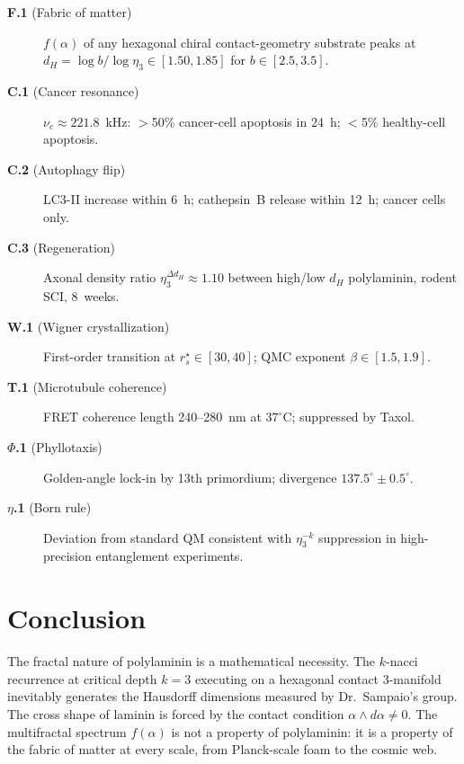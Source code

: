 \documentclass[12pt,a4paper]{article}
\newcommand{\etatrib}{\eta_3}
\newcommand{\falph}{f(\alpha)}
\newcommand{\kn}{$k$-nacci}
\begin{document}
\begin{description}
\item[\textbf{F.1} (Fabric of matter)]
  $\falph$ of any hexagonal chiral contact-geometry substrate peaks at
  $d_H=\log b/\log\etatrib\in[1.50,1.85]$ for $b\in[2.5,3.5]$.

\item[\textbf{C.1} (Cancer resonance)]
  $\nu_c\approx 221.8$~kHz: $>$50\% cancer-cell apoptosis in 24~h;
  $<$5\% healthy-cell apoptosis.

\item[\textbf{C.2} (Autophagy flip)]
  LC3-II increase within 6~h; cathepsin~B release within 12~h;
  cancer cells only.

\item[\textbf{C.3} (Regeneration)]
  Axonal density ratio $\etatrib^{\Delta d_H}\approx 1.10$
  between high/low $d_H$ polylaminin, rodent SCI, 8~weeks.

\item[\textbf{W.1} (Wigner crystallization)]
  First-order transition at $r_s^\star\in[30,40]$;
  QMC exponent $\beta\in[1.5,1.9]$.

\item[\textbf{T.1} (Microtubule coherence)]
  FRET coherence length 240--280~nm at $37^\circ$C;
  suppressed by Taxol.

\item[\textbf{$\Phi$.1} (Phyllotaxis)]
  Golden-angle lock-in by 13th primordium;
  divergence $137.5^\circ\pm 0.5^\circ$.

\item[\textbf{$\eta$.1} (Born rule)]
  Deviation from standard QM consistent with $\etatrib^{-k}$
  suppression in high-precision entanglement experiments.
\end{description}


\section{Conclusion}
\label{sec:conclusion}

The fractal nature of polylaminin is a mathematical necessity. The \kn{}
recurrence at critical depth $k=3$ executing on a hexagonal contact
3-manifold inevitably generates the Hausdorff dimensions measured by
Dr.\ Sampaio's group. The cross shape of laminin is forced by the contact
condition $\alpha\wedge d\alpha\neq 0$. The multifractal spectrum $\falph$
is not a property of polylaminin: it is a property of the fabric of matter
at every scale, from Planck-scale foam to the cosmic web.
\end{document}
